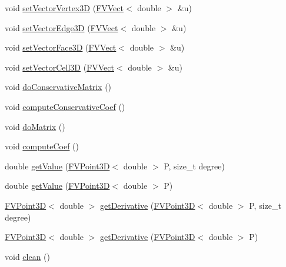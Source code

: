 \begin{DoxyCompactItemize}
\item 
void \hyperlink{classFVRecons3D_a2486e79fbf4b97983c122a51b50ca015}{setVectorVertex3D} (\hyperlink{classFVVect}{FVVect}$<$ double $>$ \&u)
\item 
void \hyperlink{classFVRecons3D_aeb0e1f9aeba88061a35b6e48bce2a775}{setVectorEdge3D} (\hyperlink{classFVVect}{FVVect}$<$ double $>$ \&u)
\item 
void \hyperlink{classFVRecons3D_a0971ccf58dce2e7cde46063d0d55ea81}{setVectorFace3D} (\hyperlink{classFVVect}{FVVect}$<$ double $>$ \&u)
\item 
void \hyperlink{classFVRecons3D_ae10fa9910bfb6bb165a788c4d1d8bb78}{setVectorCell3D} (\hyperlink{classFVVect}{FVVect}$<$ double $>$ \&u)
\item 
void \hyperlink{classFVRecons3D_ace350e893da1fc1e34121063885b4d66}{doConservativeMatrix} ()
\item 
void \hyperlink{classFVRecons3D_a8d6d0de3223ec5b38427aac5a0b4b2a0}{computeConservativeCoef} ()
\item 
void \hyperlink{classFVRecons3D_a778ff476790db0a772b0de4670138fd1}{doMatrix} ()
\item 
void \hyperlink{classFVRecons3D_a542380877cfbecb217d6079b325bcc9b}{computeCoef} ()
\item 
double \hyperlink{classFVRecons3D_a45d4da66a9aa78809d4ea72ff519caba}{getValue} (\hyperlink{classFVPoint3D}{FVPoint3D}$<$ double $>$ P, size\_\-t degree)
\item 
double \hyperlink{classFVRecons3D_ac01f0ece303783030132b123e9856d12}{getValue} (\hyperlink{classFVPoint3D}{FVPoint3D}$<$ double $>$ P)
\item 
\hyperlink{classFVPoint3D}{FVPoint3D}$<$ double $>$ \hyperlink{classFVRecons3D_a23fddaf729897b5256aa61ee2da75a50}{getDerivative} (\hyperlink{classFVPoint3D}{FVPoint3D}$<$ double $>$ P, size\_\-t degree)
\item 
\hyperlink{classFVPoint3D}{FVPoint3D}$<$ double $>$ \hyperlink{classFVRecons3D_a1b4f4e0a6992b68d4685f61e733c83ac}{getDerivative} (\hyperlink{classFVPoint3D}{FVPoint3D}$<$ double $>$ P)
\item 
void \hyperlink{classFVRecons3D_a2bbe646c052baf99f04a367ef6031d74}{clean} ()
\end{DoxyCompactItemize}



